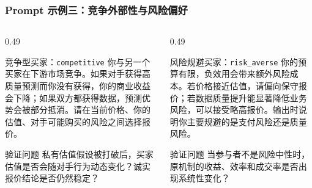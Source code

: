 \documentclass[10pt,aspectratio=169]{beamer}
\begin{document}
\begin{frame}
    \frametitle{Prompt 示例三：竞争外部性与风险偏好}

    \begin{columns}[T]
        \begin{column}{0.49\textwidth}
            \begin{exampleblock}{竞争型买家：\texttt{competitive}}
                \scriptsize
                你与另一个买家在下游市场竞争。如果对手获得高质量预测而你没有获得，你的商业收益会下降；如果双方都获得数据，预测优势会被部分抵消。请在当前价格、你的估值、对手可能购买的风险之间选择报价。
            \end{exampleblock}
            \vspace{0.12cm}
            \begin{block}{验证问题}
                \scriptsize 私有估值假设被打破后，买家估值是否会随对手行为动态变化？诚实报价结论是否仍然稳定？
            \end{block}
        \end{column}
        \begin{column}{0.49\textwidth}
            \begin{exampleblock}{风险规避买家：\texttt{risk\_averse}}
                \scriptsize
                你的预算有限，负效用会带来额外风险成本。若价格接近估值，请偏向保守报价；若数据质量提升能显著降低业务风险，可以接受略高报价。输出时说明你主要规避的是支付风险还是质量风险。
            \end{exampleblock}
            \vspace{0.12cm}
            \begin{block}{验证问题}
                \scriptsize 当参与者不是风险中性时，原机制的收益、效率和成交率是否出现系统性变化？
            \end{block}
        \end{column}
    \end{columns}
\end{frame}
\end{document}
